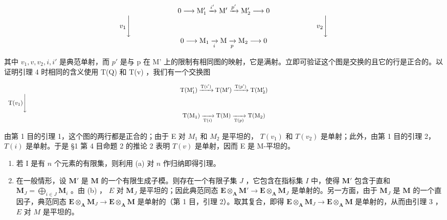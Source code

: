\[
\begin{array}{c} 0 \longrightarrow \mathrm{M} _ {1} ^ {\prime} \xrightarrow {i ^ {\prime}} \mathrm{M} ^ {\prime} \xrightarrow {p ^ {\prime}} \mathrm{M} _ {2} ^ {\prime} \longrightarrow 0 \\ v _ {1} \Biggl \downarrow \qquad \qquad \qquad \qquad \qquad \qquad \qquad \qquad \qquad \qquad \qquad \qquad \qquad v _ {2} \Biggl \downarrow \\ 0 \longrightarrow \mathrm{M} _ {1} \xrightarrow [ i ]{} \mathrm{M} \xrightarrow [ p ]{} \mathrm{M} _ {2} \longrightarrow 0 \end{array}
\]

其中 \(v_{1}, v, v_{2}, i, i'\) 是典范单射，而 \(p'\) 是与 p 在 M' 上的限制有相同图的映射，它是满射。立即可验证这个图是交换的且它的行是正合的。以证明引理 4 时相同的含义使用 T(Q) 和 T(v) ，我们有一个交换图

\[
\begin{array}{c} \mathrm{T} (\mathrm{M} _ {1} ^ {\prime}) \xrightarrow {\mathrm{T} (i ^ {\prime})} \mathrm{T} (\mathrm{M} ^ {\prime}) \xrightarrow {\mathrm{T} (p ^ {\prime})} \mathrm{T} (\mathrm{M} _ {2} ^ {\prime}) \\ \mathrm{T} (v _ {1}) \Biggl \downarrow \qquad \qquad \qquad \qquad \qquad \qquad \qquad \qquad \qquad \qquad \qquad \qquad \qquad \qquad \qquad \qquad \qquad \qquad \qquad \qquad \qquad \qquad \qquad \qquad \qquad \qquad \qquad \qquad \qquad \qquad \qquad \qquad \qquad \qquad \\ \mathrm{T} (\mathrm{M} _ {1}) \xrightarrow [ \mathrm{T} (i) ]{} \mathrm{T} (\mathrm{M}) \xrightarrow [ \mathrm{T} (p) ]{} \mathrm{T} (\mathrm{M} _ {2}) \end{array}
\]

由第 1 目的引理 1，这个图的两行都是正合的；由于 E 对 \(M_{1}\) 和 \(M_{2}\) 是平坦的， \(T(v_{1})\) 和 \(T(v_{2})\) 是单射；此外，由第 1 目的引理 2， \(T(i)\) 是单射。于是 §1 第 4 目命题 2 的推论 2 表明 \(T(v)\) 是单射，因而 E 是 M-平坦的。

\begin{enumerate}
\def\labelenumi{(\alph{enumi})}
\setcounter{enumi}{1}
\item
  若 I 是有 \(n\) 个元素的有限集，则利用 (a) 对 \(n\) 作归纳即得引理。
\item
  在一般情形，设 \(\mathbf{M}'\) 是 \(\mathbf{M}\) 的一个有限生成子模。则存在一个有限子集 \(J\) ，它包含在指标集 \(I\) 中，使得 \(\mathbf{M}'\) 包含于直和 \(\mathbf{M}_J = \bigoplus_{i \in J} \mathbf{M}_i\) 。由 (b) ， \(E\) 对 \(\mathbf{M}_J\) 是平坦的；因此典范同态 \(\mathbf{E} \otimes_{\mathbf{A}} \mathbf{M}' \to \mathbf{E} \otimes_{\mathbf{A}} \mathbf{M}_J\) 是单射的。另一方面，由于 \(\mathbf{M}_J\) 是 \(\mathbf{M}\) 的一个直因子，典范同态 \(\mathbf{E} \otimes_{\mathbf{A}} \mathbf{M}_J \to \mathbf{E} \otimes_{\mathbf{A}} \mathbf{M}\) 是单射的（第 1 目，引理 2）。取其复合，即得 \(\mathbf{E} \otimes_{\mathbf{A}} \mathbf{M}_J \to \mathbf{E} \otimes_{\mathbf{A}} \mathbf{M}\) 是单射的，从而由引理 3 ， \(E\) 对 \(M\) 是平坦的。
\end{enumerate}

